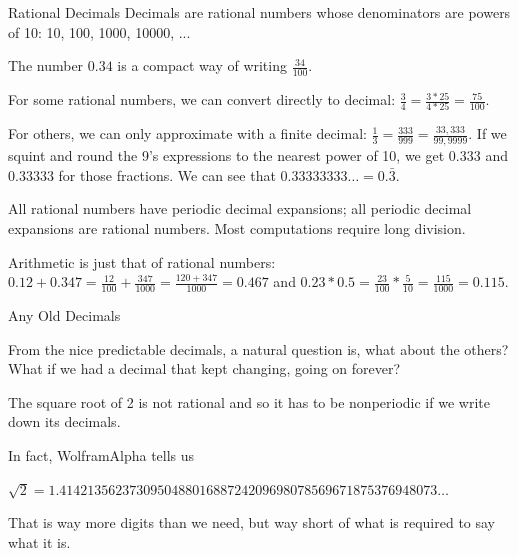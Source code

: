 \documentclass{beamer}
\begin{document}
\begin{frame}{Rational Decimals}
    Decimals are rational numbers whose denominators are powers of 10: 10, 100, 1000, 10000, ...

    The number $0.34$ is a compact way of writing $\frac{34}{100}$. 

    For some rational numbers, we can convert directly to decimal:  $\frac{3}{4} = \frac{3*25}{4*25} = \frac{75}{100}$.

    For others, we can only approximate with a finite decimal: $\frac{1}{3} =  \frac{333}{999} = \frac{33,333}{99,9999}$. If we squint and round the 9's expressions to the nearest power of 10, we get $0.333$ and $0.33 333$ for those fractions. We can see that $0.33333333\ldots = 0.\bar{3}$.

    All rational numbers have periodic decimal expansions; all periodic decimal expansions are rational numbers. Most computations require long division. 

    Arithmetic is just that of rational numbers:  $0.12+0.347= \frac{12}{100}+\frac{347}{1000} = \frac{120+347}{1000} = 0.467  $  and $0.23*0.5 = \frac{23}{100}*\frac{5}{10} = \frac{115}{1000} = 0.115$.
    
\end{frame}

\begin{frame}{Any Old Decimals}

    From the nice predictable decimals, a natural question is, what about the others? What if we had a decimal that kept changing, going on forever? 

    The square root of 2 is not rational and so it has to be nonperiodic if we write down its decimals. 

    In fact, WolframAlpha tells us

    $\sqrt{2} = 1.414213562373095048801688724209698078569671875376948073\ldots$

    That is way more digits than we need, but way short of what is required to say what it is. 
    
\end{frame}
\end{document}
